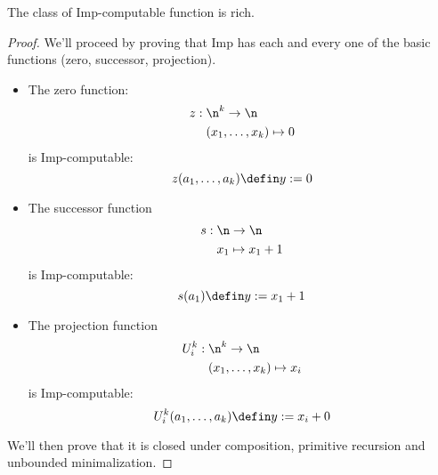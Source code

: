 \begin{lemma}
  The class of Imp-computable function is rich.
\end{lemma}

\begin{proof}

  We'll proceed by proving that Imp has each and every one of the
  basic functions (zero, successor, projection). 

  \begin{itemize}
  \item The zero function:
    \begin{align*}
      z : \; & \n^k \to \n \\
      & (x_1, \dots, x_k) \mapsto 0
    \end{align*}
    is Imp-computable: \[z(a_1,\dots,a_k) \defin y := 0\]
  \item The successor function
    \begin{align*}
      s : \; & \n \to \n \\
      & x_1 \mapsto x_1 + 1
    \end{align*}
    is Imp-computable: \[s(a_1) \defin y := x_1 + 1\]
  \item The projection function
    \begin{align*}
      U_i^k : \; & \n^k \to \n \\
      & (x_1,\dots,x_k) \mapsto x_i
    \end{align*}
    is Imp-computable: \[U_i^k(a_1, \dots, a_k) \defin y := x_i + 0\]
  \end{itemize}

  We'll then prove that it is closed under composition, primitive
  recursion and unbounded minimalization.


\end{proof}
